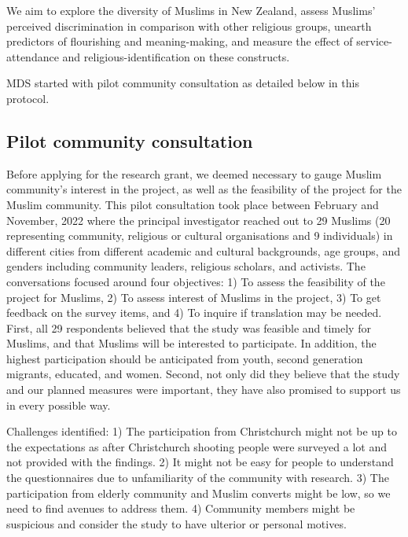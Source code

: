 \documentclass[
]{interact}
\begin{document}
We aim to explore the diversity of Muslims in New Zealand, assess
Muslims' perceived discrimination in comparison with other religious
groups, unearth predictors of flourishing and meaning-making, and
measure the effect of service-attendance and religious-identification on
these constructs.

MDS started with pilot community consultation as detailed below in this
protocol.

\subsection{Pilot community
consultation}\label{pilot-community-consultation}

Before applying for the research grant, we deemed necessary to gauge
Muslim community's interest in the project, as well as the feasibility
of the project for the Muslim community. This pilot consultation took
place between February and November, 2022 where the principal
investigator reached out to 29 Muslims (20 representing community,
religious or cultural organisations and 9 individuals) in different
cities from different academic and cultural backgrounds, age groups, and
genders including community leaders, religious scholars, and activists.
The conversations focused around four objectives: 1) To assess the
feasibility of the project for Muslims, 2) To assess interest of Muslims
in the project, 3) To get feedback on the survey items, and 4) To
inquire if translation may be needed. First, all 29 respondents believed
that the study was feasible and timely for Muslims, and that Muslims
will be interested to participate. In addition, the highest
participation should be anticipated from youth, second generation
migrants, educated, and women. Second, not only did they believe that
the study and our planned measures were important, they have also
promised to support us in every possible way.

Challenges identified: 1) The participation from Christchurch might not
be up to the expectations as after Christchurch shooting people were
surveyed a lot and not provided with the findings. 2) It might not be
easy for people to understand the questionnaires due to unfamiliarity of
the community with research. 3) The participation from elderly community
and Muslim converts might be low, so we need to find avenues to address
them. 4) Community members might be suspicious and consider the study to
have ulterior or personal motives.
\end{document}
